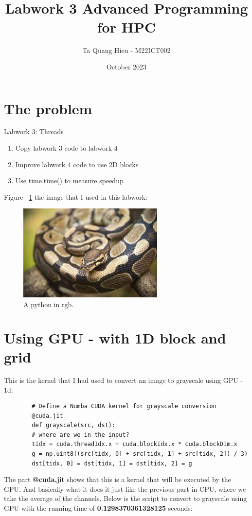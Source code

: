 \documentclass{article}
\title{Labwork 3 Advanced Programming for HPC}
\author{Ta Quang Hieu - M22ICT002}
\date{October 2023}
\begin{document}
	
	\maketitle
	
	\section{The problem}
	Labwork 3: Threads
	\begin{enumerate}
		\item Copy labwork 3 code to labwork 4
		\item Improve labwork 4 code to use 2D blocks
		\item Use time.time() to measure speedup
	\end{enumerate}
	
	Figure ~\ref{fig:python} the image that I used in this labwork:
	
	\begin{figure}
		\includegraphics[width=\linewidth]{python.jpg}
		\caption{A python in rgb.}
		\label{fig:python}
	\end{figure}
	
	\section{Using GPU - with 1D block and grid}
	This is the kernel that I had used to convert an image to grayscale using GPU - 1d:
	\begin{verbatim}
		# Define a Numba CUDA kernel for grayscale conversion
		@cuda.jit
		def grayscale(src, dst):
		# where are we in the input?
		tidx = cuda.threadIdx.x + cuda.blockIdx.x * cuda.blockDim.x
		g = np.uint8((src[tidx, 0] + src[tidx, 1] + src[tidx, 2]) / 3)
		dst[tidx, 0] = dst[tidx, 1] = dst[tidx, 2] = g
	\end{verbatim}
	The part \textbf{@cuda.jit} shows that this is a kernel that will be executed by the GPU. And basically what it does it just like the previous part in CPU, where we take the average of the channels. Below is the script to convert to grayscale using GPU with the running time of \textbf{0.1298370361328125} seconds:
	
\end{document}
